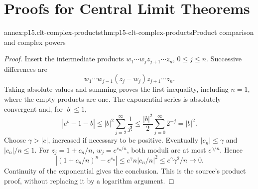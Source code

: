 \section{Proofs for Central Limit Theorems}
\label{sec:annex-p15-central-limit-theorems}

\begin{annexitem}{annex:p15.clt-complex-products}{thm:p15-clt-complex-products}{Product comparison and complex powers}
\begin{proof}
Insert the intermediate products
\(w_1\cdots w_jz_{j+1}\cdots z_n\), \(0\leq j\leq n\).
Successive differences are
\[
 w_1\cdots w_{j-1}(z_j-w_j)z_{j+1}\cdots z_n.
\]
Taking absolute values and summing proves the first inequality,
including \(n=1\), where the empty products are one.
The exponential series is absolutely convergent and, for \(|b|\leq1\),
\[
 |e^b-1-b|\leq |b|^2\sum_{j=2}^\infty\frac1{j!}
 \leq\frac{|b|^2}{2}\sum_{j=0}^\infty2^{-j}=|b|^2.
 \]
Choose \(\gamma>|c|\), increased if necessary to be positive.
Eventually \(|c_n|\leq\gamma\) and \(|c_n|/n\leq1\).
For \(z_j=1+c_n/n\), \(w_j=e^{c_n/n}\), both moduli are at
most \(e^{\gamma/n}\). Hence
\[
 |(1+c_n/n)^n-e^{c_n}|
 \leq e^\gamma n|c_n/n|^2
 \leq e^\gamma\gamma^2/n\to0.
 \]
Continuity of the exponential gives the conclusion. This is the
source's product proof, without replacing it by a logarithm argument.
\end{proof}
\end{annexitem}

